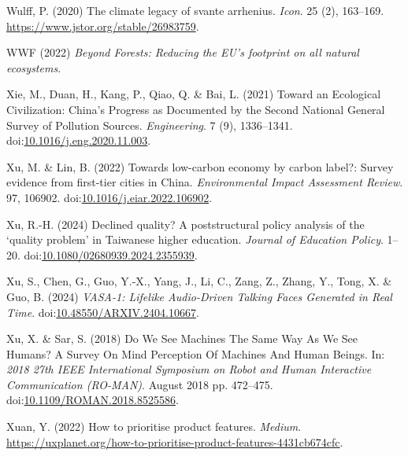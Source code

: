 \documentclass[
  letterpaper,
  DIV=11,
  numbers=noendperiod]{scrartcl}
\newlength{\cslhangindent}
\newenvironment{CSLReferences}[2] %
 {\begin{list}{}{%
  \setlength{\itemindent}{0pt}
  \setlength{\leftmargin}{0pt}
  \setlength{\parsep}{0pt}
  \ifodd #1
   \setlength{\leftmargin}{\cslhangindent}
   \setlength{\itemindent}{-1\cslhangindent}
  \fi
  \setlength{\itemsep}{#2\baselineskip}}}
 {\end{list}}
\begin{document}
\begin{CSLReferences}{0}{1}
Wulff, P. (2020) The climate legacy of svante arrhenius. \emph{Icon}. 25
(2), 163--169. \url{https://www.jstor.org/stable/26983759}.

WWF (2022) \emph{Beyond {Forests}: {Reducing} the {EU}'s footprint on
all natural ecosystems}.

Xie, M., Duan, H., Kang, P., Qiao, Q. \& Bai, L. (2021) Toward an
{Ecological Civilization}: {China}'s {Progress} as {Documented} by the
{Second National General Survey} of {Pollution Sources}.
\emph{Engineering}. 7 (9), 1336--1341.
doi:\href{https://doi.org/10.1016/j.eng.2020.11.003}{10.1016/j.eng.2020.11.003}.

Xu, M. \& Lin, B. (2022) Towards low-carbon economy by carbon label?:
{Survey} evidence from first-tier cities in {China}. \emph{Environmental
Impact Assessment Review}. 97, 106902.
doi:\href{https://doi.org/10.1016/j.eiar.2022.106902}{10.1016/j.eiar.2022.106902}.

Xu, R.-H. (2024) Declined quality? {A} poststructural policy analysis of
the {`quality problem'} in {Taiwanese} higher education. \emph{Journal
of Education Policy}. 1--20.
doi:\href{https://doi.org/10.1080/02680939.2024.2355939}{10.1080/02680939.2024.2355939}.

Xu, S., Chen, G., Guo, Y.-X., Yang, J., Li, C., Zang, Z., Zhang, Y.,
Tong, X. \& Guo, B. (2024) \emph{{VASA-1}: {Lifelike Audio-Driven
Talking Faces Generated} in {Real Time}}.
doi:\href{https://doi.org/10.48550/ARXIV.2404.10667}{10.48550/ARXIV.2404.10667}.

Xu, X. \& Sar, S. (2018) Do {We See Machines The Same Way As We See
Humans}? {A Survey On Mind Perception Of Machines And Human Beings}. In:
\emph{2018 27th {IEEE International Symposium} on {Robot} and {Human
Interactive Communication} ({RO-MAN})}. August 2018 pp. 472--475.
doi:\href{https://doi.org/10.1109/ROMAN.2018.8525586}{10.1109/ROMAN.2018.8525586}.

Xuan, Y. (2022) How to prioritise product features. \emph{Medium}.
\url{https://uxplanet.org/how-to-prioritise-product-features-4431cb674cfc}.


\end{CSLReferences}
\end{document}

